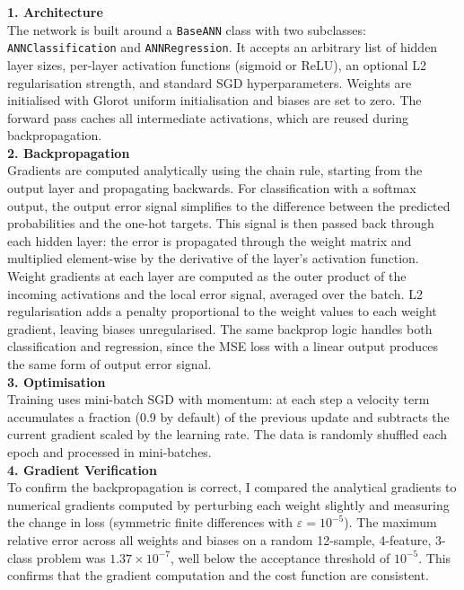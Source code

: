 \documentclass[fleqn,moreauthors,10pt]{ds_report}
\begin{document}
\textbf{1. Architecture}\\
The network is built around a \texttt{BaseANN} class with two subclasses:
\texttt{ANNClassification} and \texttt{ANNRegression}. It accepts an arbitrary list
of hidden layer sizes, per-layer activation functions (sigmoid or ReLU), an optional
L2 regularisation strength, and standard SGD hyperparameters. Weights are initialised
with Glorot uniform initialisation and biases are set to zero. The forward pass caches
all intermediate activations, which are reused during backpropagation.
\vspace{0.3cm}
\\
\textbf{2. Backpropagation}\\
Gradients are computed analytically using the chain rule, starting from the output
layer and propagating backwards. For classification with a softmax output, the output
error signal simplifies to the difference between the predicted probabilities and the
one-hot targets. This signal is then passed back through each hidden layer: the error
is propagated through the weight matrix and multiplied element-wise by the derivative
of the layer's activation function. Weight gradients at each layer are computed as
the outer product of the incoming activations and the local error signal, averaged
over the batch. L2 regularisation adds a penalty proportional to the weight values
to each weight gradient, leaving biases unregularised. The same backprop logic handles
both classification and regression, since the MSE loss with a linear output produces
the same form of output error signal.
\vspace{0.3cm}
\\
\textbf{3. Optimisation}\\
Training uses mini-batch SGD with momentum: at each step a velocity term accumulates
a fraction (0.9 by default) of the previous update and subtracts the current gradient
scaled by the learning rate. The data is randomly shuffled each epoch and processed
in mini-batches.
\vspace{0.3cm}
\\
\textbf{4. Gradient Verification}\\
To confirm the backpropagation is correct, I compared the analytical gradients to
numerical gradients computed by perturbing each weight slightly and measuring the
change in loss (symmetric finite differences with $\varepsilon = 10^{-5}$). The
maximum relative error across all weights and biases on a random 12-sample,
4-feature, 3-class problem was $1.37 \times 10^{-7}$, well below the acceptance
threshold of $10^{-5}$. This confirms that the gradient computation and the cost
function are consistent.
\end{document}
